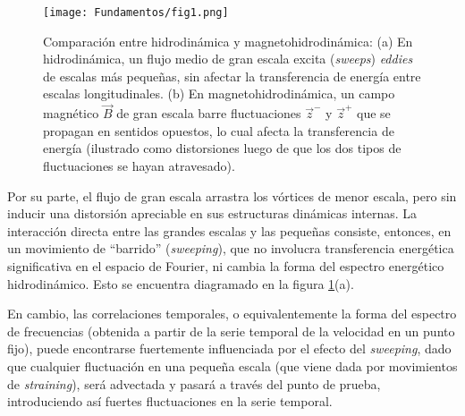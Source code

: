 \begin{figure}[h]
  \centering
  \texttt{[image: Fundamentos/fig1.png]}
  \caption{Comparación entre hidrodinámica y magnetohidrodinámica: (a)
    En hidrodinámica, un flujo medio de gran escala excita
    (\emph{sweeps}) \emph{eddies} de escalas más pequeñas, sin
    afectar la transferencia de energía entre escalas
    longitudinales. (b) En magnetohidrodinámica, un campo magnético
    $\vec{B}$ de gran escala barre fluctuaciones $\vec{z}^-$ y
    $\vec{z}^+$ que se propagan en sentidos opuestos, lo cual afecta
    la transferencia de energía (ilustrado como distorsiones luego de
    que los dos tipos de fluctuaciones se hayan atravesado).}
  \label{fig:HDvsMHD}
\end{figure}



Por su parte, el flujo de gran escala arrastra los vórtices de menor
escala, pero sin inducir una distorsión apreciable en sus estructuras
dinámicas internas. La interacción directa entre las grandes escalas y
las pequeñas consiste, entonces, en un movimiento de ``barrido''
(\textit{sweeping}), que no involucra transferencia energética
significativa en el espacio de Fourier, ni cambia la forma del
espectro energético hidrodinámico. Esto se encuentra diagramado en la
figura \ref{fig:HDvsMHD}(a).

En cambio, las correlaciones temporales, o equivalentemente la forma
del espectro de frecuencias (obtenida a partir de la serie temporal de
la velocidad en un punto fijo), puede encontrarse fuertemente
influenciada por el efecto del \textit{sweeping}, dado que cualquier
fluctuación en una pequeña escala (que viene dada por movimientos de
\textit{straining}), será advectada y pasará a través del punto de
prueba, introduciendo así fuertes fluctuaciones en la serie temporal.

